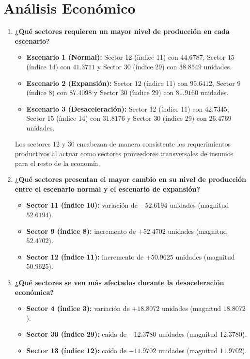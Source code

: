 \documentclass[11pt,a4paper]{article}
\begin{document}
\section{Análisis Económico}

\begin{enumerate}[leftmargin=*]
    \item \textbf{¿Qué sectores requieren un mayor nivel de producción en cada escenario?}
    \begin{itemize}
        \item \textbf{Escenario 1 (Normal):} Sector 12 (índice 11) con $44.6787$, Sector 15 (índice 14) con $41.3711$ y Sector 30 (índice 29) con $38.8549$ unidades.
        \item \textbf{Escenario 2 (Expansión):} Sector 12 (índice 11) con $95.6412$, Sector 9 (índice 8) con $87.4098$ y Sector 30 (índice 29) con $81.9160$ unidades.
        \item \textbf{Escenario 3 (Desaceleración):} Sector 12 (índice 11) con $42.7345$, Sector 15 (índice 14) con $31.8176$ y Sector 30 (índice 29) con $26.4769$ unidades.
    \end{itemize}
    Los sectores 12 y 30 encabezan de manera consistente los requerimientos productivos al actuar como sectores proveedores transversales de insumos para el resto de la economía.

    \item \textbf{¿Qué sectores presentan el mayor cambio en su nivel de producción entre el escenario normal y el escenario de expansión?}
    \begin{itemize}
        \item \textbf{Sector 11 (índice 10):} variación de $-52.6194$ unidades (magnitud $52.6194$).
        \item \textbf{Sector 9 (índice 8):} incremento de $+52.4702$ unidades (magnitud $52.4702$).
        \item \textbf{Sector 12 (índice 11):} incremento de $+50.9625$ unidades (magnitud $50.9625$).
    \end{itemize}

    \item \textbf{¿Qué sectores se ven más afectados durante la desaceleración económica?}
    \begin{itemize}
        \item \textbf{Sector 4 (índice 3):} variación de $+18.8072$ unidades (magnitud $18.8072$).
        \item \textbf{Sector 30 (índice 29):} caída de $-12.3780$ unidades (magnitud $12.3780$).
        \item \textbf{Sector 13 (índice 12):} caída de $-11.9702$ unidades (magnitud $11.9702$).
    \end{itemize}


\end{enumerate}
\end{document}
